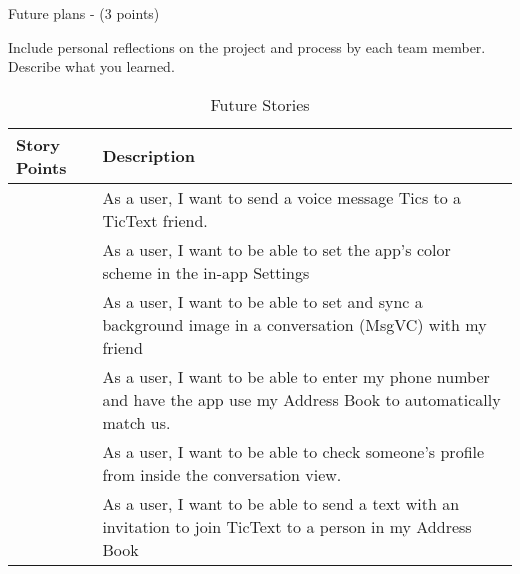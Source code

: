 Future plans - (3 points)

Include personal reflections on the project and process by each team member. Describe what you learned.

\begin{quote}
\lipsum[2]
\end{quote}

\begin{quote}
\lipsum[2]
\end{quote}

\begin{quote}
\lipsum[2]
\end{quote}

\begin{quote}
\lipsum[2]
\end{quote}

\begin{quote}
\lipsum[2]
\end{quote}

\begin{table}[h]
	\centering
	\caption{Future Stories}
	 \renewcommand{\arraystretch}{1.2}
	\begin{tabular}{>{\centering\arraybackslash}m{2.5cm} | m{11.5cm} }
		\toprule
		Story Points & Description\\
		\midrule
		5 	& As a user, I want to send a voice message Tics to a TicText friend.\\
		3 	& As a user, I want to be able to set the app's color scheme in the in-app Settings\\
		5 	& As a user, I want to be able to set and sync a background image in a conversation (MsgVC) with my friend\\
		8 	& As a user, I want to be able to enter my phone number and have the app use my Address Book to automatically match us.\\
		3 	& As a user, I want to be able to check someone's profile from inside the conversation view.\\
		3 	& As a user, I want to be able to send a text with an invitation to join TicText to a person in my Address Book\\
		\bottomrule
	\end{tabular}
\end{table}
